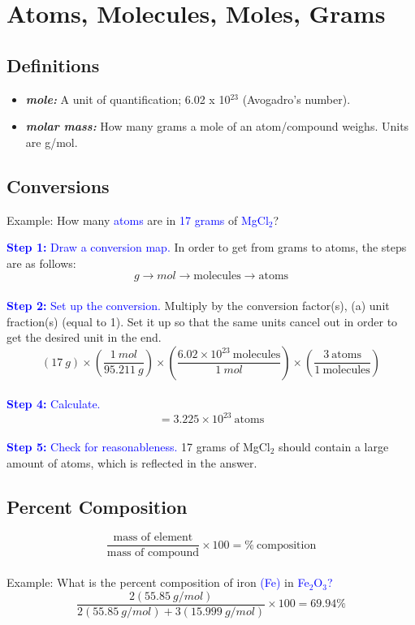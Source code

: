 \documentclass[a4paper, 12pt]{article}
\begin{document}
\section{Atoms, Molecules, Moles, Grams}

\subsection*{Definitions}

\begin{itemize}[leftmargin=*, nosep]
    \item \textbf{\textit{mole:}} A unit of quantification; 6.02 x 10$^{23}$ (Avogadro's number).
    \item \textbf{\textit{molar mass:}} How many grams a mole of an atom/compound weighs. Units are g/mol.
\end{itemize}

\subsection*{Conversions}

Example: How many \textcolor{blue}{atoms} are in \textcolor{blue}{17 grams} of \textcolor{blue}{MgCl$_2$}?
 
\textcolor{blue}{\textbf{Step 1:} Draw a conversion map.} In order to get from grams to atoms, the steps are as follows:
\\
$$g \longrightarrow mol \longrightarrow {\text{molecules}} \longrightarrow {\text{atoms}}$$
\\
\textcolor{blue}{\textbf{Step 2:} Set up the conversion.} Multiply by the conversion factor(s), (a) unit fraction(s) (equal to 1). Set it up so that the same units cancel out in order to get the desired unit in the end.
\\
$$(17\: g) \times \left(\frac{1 \: mol}{95.211 \: g}\right) \times \left(\frac{6.02 \times 10^{23} \: {\text{molecules}}}{1 \: mol}\right) \times \left(\frac{3 \: {\text{atoms}}}{1 \: {\text{molecules}}}\right)$$
\\
\textcolor{blue}{\textbf{Step 4:} Calculate.} 
\\
$$=3.225 \times 10^{23} \: {\text{atoms}}$$
\\
\textcolor{blue}{\textbf{Step 5:} Check for reasonableness.} 17 grams of MgCl$_2$ should contain a large amount of atoms, which is reflected in the answer.

\subsection*{Percent Composition}
$$\frac{\text{mass of element}}{\text{mass of compound}} \times 100 = \% \: \text{composition}$$
\\
Example: What is the percent composition of iron \textcolor{blue}{(Fe)} in \textcolor{blue}{Fe$_2$O$_3$?}
\\
$$\frac{2(55.85 \: g/mol)}{2(55.85 \: g/mol) + 3(15.999 \: g/mol)} \times 100 = 69.94\%$$
\end{document}

